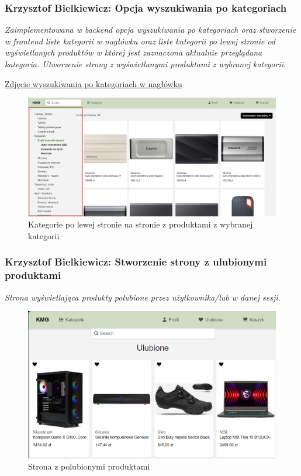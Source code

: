 \documentclass[12pt,a4paper,oneside]{article}
\theoremstyle{definition}
\numberwithin{equation}{section}
\begin{document}
    
\subsubsection{Krzysztof Bielkiewicz: Opcja wyszukiwania po kategoriach}
\label{1.3.4}
    \textit{Zaimplementowana w backend opcja wyszukiwania po kategoriach
     oraz stworzenie w frontend liste kategorii w nagłówku
      oraz liste kategorii po lewej stronie od wyświetlanych produktów w której jest zaznaczona
      aktualnie przeglądana kategoria. Utworzenie strony z wyświetlanymi produktami z wybranej kategorii.}
    \begin{center}
        \hyperref[header-categories]{Zdjęcie wyszukiwania po kategoriach w nagłówku}
    \end{center}

    \begin{figure}[H]
        \centering
        \includegraphics[width=0.8\columnwidth]{images/krzysztofBImages/lewe-kategorie.png}
        \caption{Kategorie po lewej stronie na stronie z produktami z wybranej kategorii}
    \end{figure}


\subsubsection{Krzysztof Bielkiewicz: Stworzenie strony z ulubionymi produktami}
\label{1.3.5}
\textit{Strona wyświetlająca produkty polubione przez użytkownika/lub w danej sesji.}

\begin{figure}[H]
    \centering
    \includegraphics[width=0.8\columnwidth]{images/krzysztofBImages/strona-ulubione.png}
    \caption{Strona z polubionymi produktami}
\end{figure}
\end{document}
